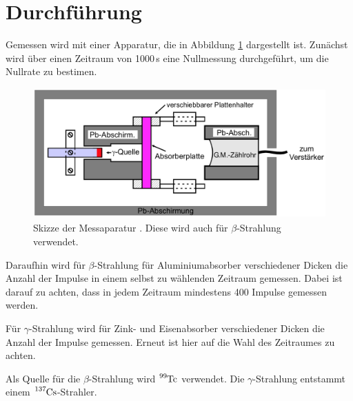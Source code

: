 \section{Durchführung}
\label{sec:Durchführung}

Gemessen wird mit einer Apparatur, die in Abbildung \ref{fig:geraet} dargestellt
ist. Zunächst wird über einen Zeitraum von 1000\,s eine Nullmessung durchgeführt,
um die Nullrate zu bestimen.

\begin{figure}
  \centering
  \includegraphics[height=5cm]{data/aufbau.png}
  \caption{Skizze der Messaparatur \cite{Versuchsanleitung}. Diese wird auch
  für $\beta$-Strahlung verwendet.}
  \label{fig:geraet}
\end{figure}

Daraufhin wird für $\beta$-Strahlung für Aluminiumabsorber verschiedener Dicken
die Anzahl der Impulse in einem selbst zu wählenden Zeitraum gemessen. Dabei ist
darauf zu achten, dass in jedem Zeitraum mindestens 400 Impulse gemessen werden.

Für $\gamma$-Strahlung wird für Zink- und Eisenabsorber verschiedener Dicken
die Anzahl der Impulse gemessen. Erneut ist hier auf die Wahl des Zeitraumes
zu achten.

Als Quelle für die $\beta$-Strahlung wird $\ce{^{99}Tc}$ verwendet. Die $\gamma$-Strahlung
entstammt einem $\ce{^{137}Cs}$-Strahler.
